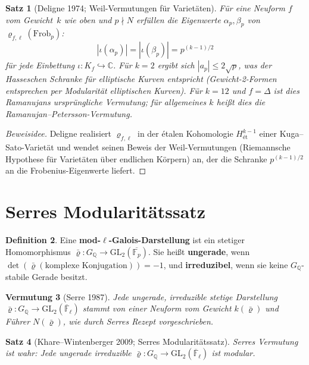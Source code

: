 \documentclass[a4paper,12pt]{amsart}
\newtheorem{theorem}{Satz}[section]
\newtheorem{conjecture}[theorem]{Vermutung}
\theoremstyle{definition}
\newtheorem{definition}[theorem]{Definition}
\theoremstyle{remark}
\newcommand{\Q}{\mathbb{Q}}
\newcommand{\Fp}{\mathbb{F}_p}
\newcommand{\GL}{\mathrm{GL}}
\newcommand{\Frob}{\mathrm{Frob}}
\begin{document}
\begin{theorem}[Deligne 1974; Weil-Vermutungen für Varietäten]
\label{satz:ramanujan-deligne}
Für eine Neuform $f$ vom Gewicht~$k$ wie oben und $p \nmid N$ erfüllen die Eigenwerte
$\alpha_p, \beta_p$ von $\varrho_{f,\ell}(\Frob_p)$:
\[
  |\iota(\alpha_p)| = |\iota(\beta_p)| = p^{(k-1)/2}
\]
für jede Einbettung $\iota\colon K_f \hookrightarrow \mathbb{C}$.
Für $k = 2$ ergibt sich $|a_p| \leq 2\sqrt{p}$, was der \emph{Hasseschen Schranke}
für elliptische Kurven entspricht (Gewicht-2-Formen entsprechen per Modularität elliptischen
Kurven).  Für $k = 12$ und $f = \Delta$ ist dies Ramanujans ursprüngliche Vermutung;
für allgemeines $k$ heißt dies die \emph{Ramanujan--Petersson-Vermutung}.
\end{theorem}

\begin{proof}[Beweisidee]
Deligne realisiert $\varrho_{f,\ell}$ in der étalen Kohomologie $H^{k-1}_{\text{ét}}$
einer Kuga--Sato-Varietät und wendet seinen Beweis der Weil-Vermutungen (Riemannsche
Hypothese für Varietäten über endlichen Körpern) an, der die Schranke $p^{(k-1)/2}$
an die Frobenius-Eigenwerte liefert.
\end{proof}

\section{Serres Modularitätssatz}
\label{sec:serre}

\begin{definition}
Eine \textbf{mod-$\ell$-Galois-Darstellung} ist ein stetiger Homomorphismus
$\bar{\varrho}\colon G_\Q \to \GL_2(\overline{\Fp})$.
Sie heißt \textbf{ungerade}, wenn $\det(\bar{\varrho}(\text{komplexe Konjugation})) = -1$,
und \textbf{irreduzibel}, wenn sie keine $G_\Q$-stabile Gerade besitzt.
\end{definition}

\begin{conjecture}[Serre 1987]
Jede ungerade, irreduzible stetige Darstellung
$\bar{\varrho}\colon G_\Q \to \GL_2(\overline{\mathbb{F}}_\ell)$
stammt von einer Neuform vom Gewicht $k(\bar{\varrho})$ und Führer $N(\bar{\varrho})$,
wie durch Serres Rezept vorgeschrieben.
\end{conjecture}

\begin{theorem}[Khare--Wintenberger 2009; Serres Modularitätssatz]
\label{satz:serre}
Serres Vermutung ist wahr: Jede ungerade irreduzible
$\bar{\varrho}\colon G_\Q \to \GL_2(\overline{\mathbb{F}}_\ell)$ ist modular.
\end{theorem}
\end{document}
